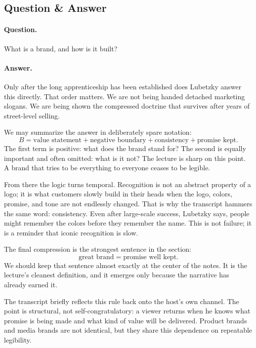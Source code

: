 \subsection{Question \& Answer}

\paragraph{Question.} What is a brand, and how is it built?

\paragraph{Answer.} Only after the long apprenticeship has been established does Lubetzky answer this directly. That order matters. We are not being handed detached marketing slogans. We are being shown the compressed doctrine that survives after years of street-level selling.

We may summarize the answer in deliberately spare notation:
\begin{equation}
B=\text{value statement}+\text{negative boundary}+\text{consistency}+\text{promise kept}.
\end{equation}
The first term is positive: what does the brand stand for? The second is equally important and often omitted: what is it not? The lecture is sharp on this point. A brand that tries to be everything to everyone ceases to be legible.

From there the logic turns temporal. Recognition is not an abstract property of a logo; it is what customers slowly build in their heads when the logo, colors, promise, and tone are not endlessly changed. That is why the transcript hammers the same word: consistency. Even after large-scale success, Lubetzky says, people might remember the colors before they remember the name. This is not failure; it is a reminder that iconic recognition is slow.

The final compression is the strongest sentence in the section:
\begin{equation}
\text{great brand}=\text{promise well kept}.
\end{equation}
We should keep that sentence almost exactly at the center of the notes. It is the lecture's cleanest definition, and it emerges only because the narrative has already earned it.

The transcript briefly reflects this rule back onto the host's own channel. The point is structural, not self-congratulatory: a viewer returns when he knows what promise is being made and what kind of value will be delivered. Product brands and media brands are not identical, but they share this dependence on repeatable legibility.

